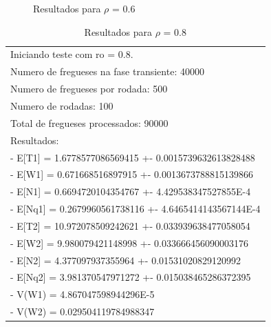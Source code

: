 \documentclass[a4paper,12pt]{report}
\begin{document}
\begin{figure}[htbp]
   \centering
   \caption{Resultados para $\rho$ = 0.6}
\end{figure}

\begin{table}[htbp]
  \begin{tabular}{l}
	\small Iniciando teste com ro = 0.8. \\
	\small Numero de fregueses na fase transiente: 40000 \\
	\small Numero de fregueses por rodada: 500 \\
	\small Numero de rodadas: 100 \\
	\small Total de fregueses processados: 90000 \\
	\small Resultados: \\
	\small - E[T1] = 1.6778577086569415 +- 0.0015739632613828488 \\
	\small - E[W1] = 0.671668516897915 +- 0.0013673788815139866 \\
	\small - E[N1] = 0.6694720104354767 +- 4.429538347527855E-4 \\
	\small - E[Nq1] = 0.2679960561738116 +- 4.6465414143567144E-4 \\
	\small - E[T2] = 10.972078509242621 +- 0.033939638477058054 \\
	\small - E[W2] = 9.980079421148998 +- 0.033666456090003176 \\
	\small - E[N2] = 4.377097937355964 +- 0.01531020829120992 \\
	\small - E[Nq2] = 3.981370547971272 +- 0.015038465286372395 \\
	\small - V(W1) = 4.867047598944296E-5 \\
	\small - V(W2) = 0.029504119784988347 \\
  \end{tabular}
\caption{Resultados para $\rho$ = 0.8}
\end{table}
\end{document}

